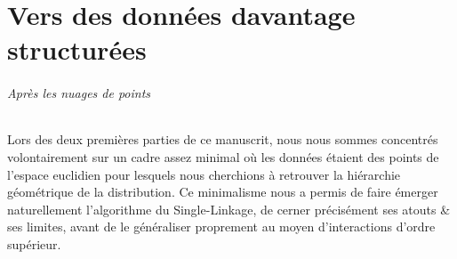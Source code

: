 \documentclass{these-ISSS} %
\begin{document}












\part{Vers des données davantage structurées}

\paragraph{Après les nuages de points}
Lors des deux premières parties de ce manuscrit, nous nous sommes concentrés volontairement sur un cadre assez minimal où les données étaient des points de l'espace euclidien pour lesquels nous cherchions à retrouver la hiérarchie géométrique de la distribution.
Ce minimalisme nous a permis de faire émerger naturellement l'algorithme du Single-Linkage, de cerner précisément ses atouts \& ses limites, avant de le généraliser proprement au moyen d'interactions d'ordre supérieur.
\end{document}

